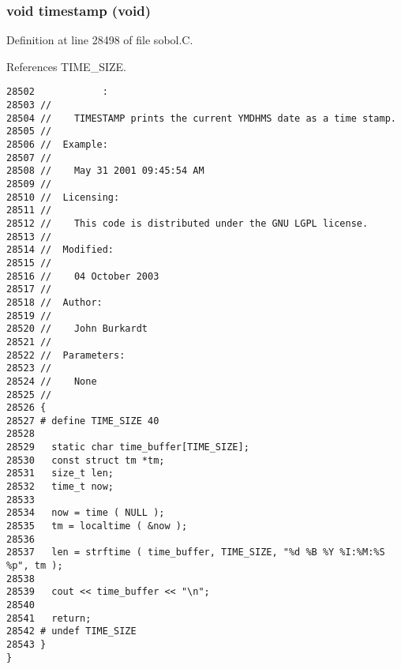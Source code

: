 \subsubsection{\setlength{\rightskip}{0pt plus 5cm}void timestamp (void)}\label{sobol_8C_02d8f81e512334c1e2e5be025c41afa8}




Definition at line 28498 of file sobol.C.

References TIME\_\-SIZE.

\begin{Code}\begin{verbatim}28502            :
28503 //
28504 //    TIMESTAMP prints the current YMDHMS date as a time stamp.
28505 //
28506 //  Example:
28507 //
28508 //    May 31 2001 09:45:54 AM
28509 //
28510 //  Licensing:
28511 //
28512 //    This code is distributed under the GNU LGPL license. 
28513 //
28514 //  Modified:
28515 //
28516 //    04 October 2003
28517 //
28518 //  Author:
28519 //
28520 //    John Burkardt
28521 //
28522 //  Parameters:
28523 //
28524 //    None
28525 //
28526 {
28527 # define TIME_SIZE 40
28528 
28529   static char time_buffer[TIME_SIZE];
28530   const struct tm *tm;
28531   size_t len;
28532   time_t now;
28533 
28534   now = time ( NULL );
28535   tm = localtime ( &now );
28536 
28537   len = strftime ( time_buffer, TIME_SIZE, "%d %B %Y %I:%M:%S %p", tm );
28538 
28539   cout << time_buffer << "\n";
28540 
28541   return;
28542 # undef TIME_SIZE
28543 }
}
\end{verbatim}
\end{Code}



